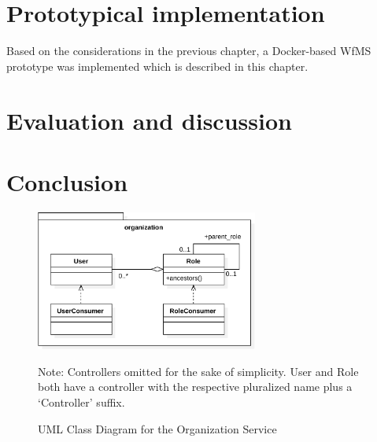 \documentclass[language=english,noinputenc]{wiwwuwordrprt}
\renewcommand\listingscaption{Lis.}
\begin{document}
      


  \chapter{Prototypical implementation} %
    \label{cha:implementation}
    Based on the considerations in the previous chapter, a Docker-based \ac{WfMS} prototype was implemented  which is described in this chapter.
    

  \chapter{Evaluation and discussion} %
    \label{cha:evaluation}
    

  \chapter{Conclusion} %
    \label{cha:conclusion}
    

  
  

  \appendix

  \renewcommand\listingscaption{Lis.}
  \captionsetup[listing]{labelformat=simple}


    \begin{figure}[htbp]
      \centering
      \includegraphics[width=0.65\textwidth]{content/images/class_diagram_organization-crop.pdf}
      \caption*{\scriptsize Note: Controllers omitted for the sake of simplicity. User and Role both have a controller with the respective pluralized name plus a `Controller' suffix.}
      \caption{UML Class Diagram for the Organization Service}
      \label{fig:uml_class_diagram_organization}
    \end{figure}
\end{document}
